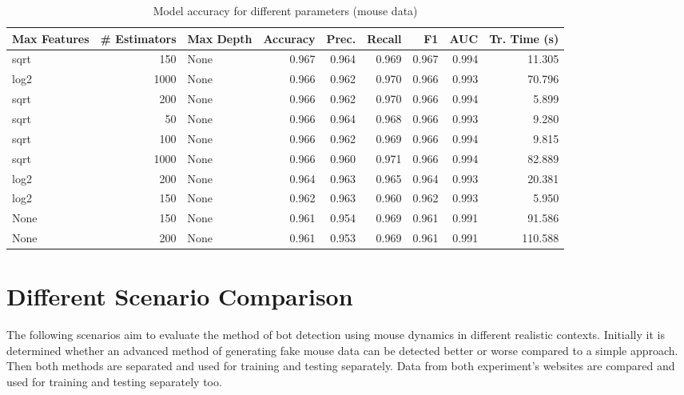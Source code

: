 \documentclass[
    fontsize=12pt,
    headings=small,
    parskip=half,           %
    bibliography=totoc,
    numbers=noenddot,       %
    open=any,               %
    final,                   %
    table
]{scrreprt}
\begin{document}
\begin{table}
    \begin{center}
        \begin{tabular}{lrlrrrrrr}
            \toprule Max Features & \# Estimators & Max Depth & Accuracy & Prec. & Recall & F1 & AUC & Tr. Time (s) \\
            \midrule
            sqrt & 150 & None & 0.967 & 0.964 & 0.969 & 0.967 & 0.994 & 11.305 \\
            log2 & 1000 & None & 0.966 & 0.962 & 0.970 & 0.966 & 0.993 & 70.796 \\
            \rowcolor{green}
            sqrt & 200 & None & 0.966 & 0.962 & 0.970 & 0.966 & 0.994 & 5.899 \\
            sqrt & 50 & None & 0.966 & 0.964 & 0.968 & 0.966 & 0.993 & 9.280 \\
            sqrt & 100 & None & 0.966 & 0.962 & 0.969 & 0.966 & 0.994 & 9.815 \\
            sqrt & 1000 & None & 0.966 & 0.960 & 0.971 & 0.966 & 0.994 & 82.889 \\
            log2 & 200 & None & 0.964 & 0.963 & 0.965 & 0.964 & 0.993 & 20.381 \\
            log2 & 150 & None & 0.962 & 0.963 & 0.960 & 0.962 & 0.993 & 5.950 \\
            None & 150 & None & 0.961 & 0.954 & 0.969 & 0.961 & 0.991 & 91.586 \\
            None & 200 & None & 0.961 & 0.953 & 0.969 & 0.961 & 0.991 & 110.588 \\
            \bottomrule
        \end{tabular}
    \end{center}
    \caption{Model accuracy for different parameters (mouse data)}
    \label{table:mouse_params}
\end{table}

\section{Different Scenario Comparison}

The following scenarios aim to evaluate the method of bot detection using mouse dynamics in different realistic contexts. Initially it is determined whether an advanced method of generating fake mouse data can be detected better or worse compared to a simple approach. Then both methods are separated and used for training and testing separately. Data from both experiment's websites are compared and used for training and testing separately too.
\end{document}
